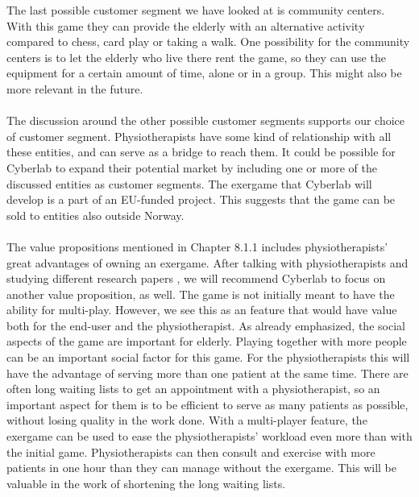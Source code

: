 The last possible customer segment we have looked at is community centers. With this game they can provide the elderly with an alternative activity compared to chess, card play or taking a walk. One possibility for the community centers is to let the elderly who live there rent the game, so they can use the equipment for a certain amount of time, alone or in a group. This might also be more relevant in the future. \\ \\
The discussion around the other possible customer segments supports our choice of customer segment. Physiotherapists have some kind of relationship with all these entities, and can serve as a bridge to reach them. It could be possible for Cyberlab to expand their potential market by including one or more of the discussed entities as customer segments. The exergame that Cyberlab will develop is a part of an EU-funded project. This suggests that the game can be sold to entities also outside Norway.  \\ \\
The value propositions mentioned in Chapter 8.1.1 includes physiotherapists' great advantages of owning an exergame. After talking with physiotherapists and studying different research papers \cite{taylor2011activity} \cite{exergamesforelderly}, we will recommend Cyberlab to focus on another value proposition, as well. The game is not initially meant to have the ability for multi-play. However, we see this as an feature that would have value both for the end-user and the physiotherapist. As already emphasized, the social aspects of the game are important for elderly. Playing together with more people can be an important social factor for this game. For the physiotherapists this will have the advantage of serving more than one patient at the same time. There are often long waiting lists to get an appointment with a physiotherapist, so an important aspect for them is to be efficient to serve as many patients as possible, without losing quality in the work done. With a multi-player feature, the exergame can be used to ease the physiotherapists' workload even more than with the initial game. Physiotherapists can then consult and exercise with more patients in one hour than they can manage without the exergame. This will be valuable in the work of shortening the long waiting lists. \\ \\
